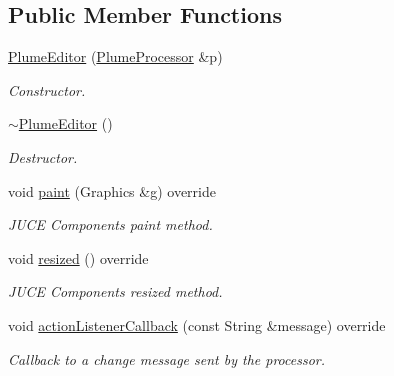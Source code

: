 \subsection*{Public Member Functions}
\begin{DoxyCompactItemize}
\item 
\mbox{\hyperlink{class_plume_editor_a0b9b4a952769836ca43c49ed020951f9}{Plume\+Editor}} (\mbox{\hyperlink{class_plume_processor}{Plume\+Processor}} \&p)
\begin{DoxyCompactList}\small\item\em Constructor. \end{DoxyCompactList}\item 
\mbox{\label{class_plume_editor_af16dd852a3419961627d070d62e3e644}} 
\mbox{\hyperlink{class_plume_editor_af16dd852a3419961627d070d62e3e644}{$\sim$\+Plume\+Editor}} ()
\begin{DoxyCompactList}\small\item\em Destructor. \end{DoxyCompactList}\item 
\mbox{\label{class_plume_editor_a3b31e2023faf921f446b132b24a917c0}} 
void \mbox{\hyperlink{class_plume_editor_a3b31e2023faf921f446b132b24a917c0}{paint}} (Graphics \&g) override
\begin{DoxyCompactList}\small\item\em J\+U\+CE Components\textquotesingle{} paint method. \end{DoxyCompactList}\item 
\mbox{\label{class_plume_editor_aa42064f898f3a543173c5b29c7b2932c}} 
void \mbox{\hyperlink{class_plume_editor_aa42064f898f3a543173c5b29c7b2932c}{resized}} () override
\begin{DoxyCompactList}\small\item\em J\+U\+CE Components\textquotesingle{} resized method. \end{DoxyCompactList}\item 
void \mbox{\hyperlink{class_plume_editor_a04371047171d9eab921db9e8e7011bb8}{action\+Listener\+Callback}} (const String \&message) override
\begin{DoxyCompactList}\small\item\em Callback to a change message sent by the processor. \end{DoxyCompactList}\item 

\end{DoxyCompactItemize}
